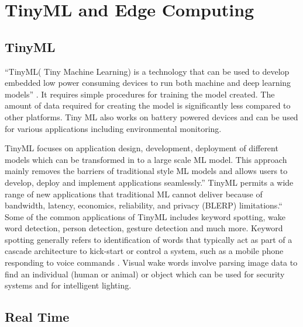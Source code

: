 %
%
%






\chapter{TinyML and Edge Computing}

\section{TinyML} 
``TinyML( Tiny Machine Learning) is a technology that can be used to develop embedded low power consuming devices to run both machine and deep learning models'' \cite{Gupta:2020c}. It requires simple procedures for training the model created. The amount of data required for creating the model is significantly less compared to other platforms. Tiny ML also works on battery powered devices and can be used for various applications including environmental monitoring. 

TinyML focuses on application design, development, deployment of different models which can be transformed in to a large scale ML model. This approach mainly removes the barriers of traditional style ML models and allows users to develop, deploy and implement applications seamlessly.” TinyML permits a wide range of new applications that traditional ML cannot deliver because of bandwidth, latency, economics, reliability, and privacy (BLERP) limitations.“ \cite{Reddi:2021}  
Some of the common applications of TinyML includes keyword spotting, wake word detection, person detection, gesture detection and much more. Keyword spotting generally refers to identification of words that typically act as part of a cascade architecture to kick-start or control a system, such as a mobile phone responding to voice commands \cite{Reddi:2021}. Visual wake words involve parsing image data to find an individual (human or animal) or object which can be used for security systems and for intelligent lighting. 


\section{Real Time} 

